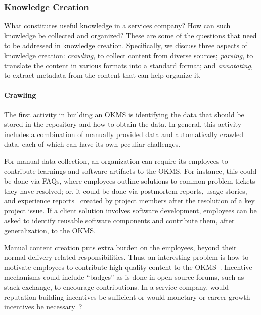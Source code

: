 
\subsubsection{Knowledge Creation}

What constitutes useful knowledge in a services company? How can such knowledge
be collected and organized? These are some of the questions that need to be
addressed in knowledge creation. Specifically, we discuss three aspects of
knowledge creation: \textit{crawling}, to collect content from diverse
sources; \textit{parsing}, to translate the content in various formats into a
standard format; and \textit{annotating}, to extract metadata from the content
that can help organize it.

\vskip -5pt
\paragraph*{Crawling} The first activity in building an OKMS is
identifying the data that should be stored in the repository and how to obtain
the data. In general, this activity includes a combination of manually provided
data and automatically crawled data, each of which can have its own peculiar
challenges.

For manual data collection, an organization can require its employees to
contribute learnings and software artifacts to the OKMS. For instance, this
could be done via FAQs, where employees outline solutions to common problem
tickets they have resolved; or, it could be done via postmortem reports, usage
stories, and experience reports~\cite{desouza:2005} created by project members
after the resolution of a key project issue. If a client solution involves
software development, employees can be asked to identify reusable software
components and contribute them, after generalization, to the OKMS.

Manual content creation puts extra burden on the employees, beyond their normal
delivery-related responsibilities. Thus, an interesting problem is how to
motivate employees to contribute high-quality content to the
OKMS~\cite{hendriks1999share}. Incentive mechanisms could include ``badges'' as
is done in open-source forums, such as stack exchange, to encourage
contributions. In a service company, would reputation-building incentives be
sufficient or would monetary or career-growth incentives be
necessary~\cite{bartol2002encouraging}?

